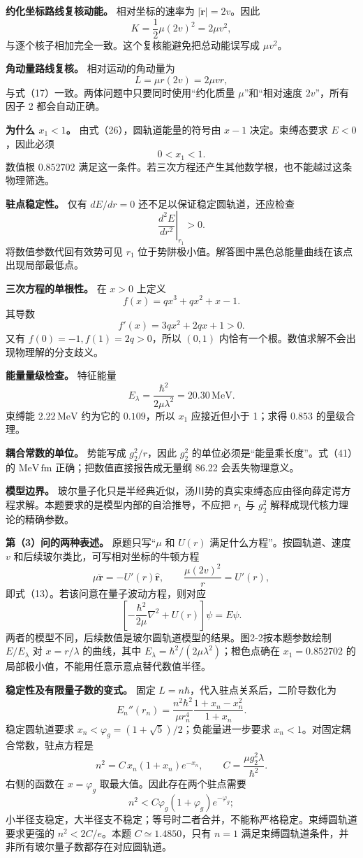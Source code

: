 \documentclass[12pt,a4paper,UTF8]{ctexart}
\begin{document}
\textbf{约化坐标路线复核动能。} 相对坐标的速率为
\(|\dot{\bm r}|=2v\)。因此 \[
K=\frac12\mu(2v)^2=2\mu v^2, \tag{43}
\] 与逐个核子相加完全一致。这个复核能避免把总动能误写成 \(\mu v^2\)。

\textbf{角动量路线复核。} 相对运动的角动量为 \[
L=\mu r(2v)=2\mu vr, \tag{44}
\] 与式（17）一致。两体问题中只要同时使用``约化质量
\(\mu\)''和``相对速度 \(2v\)''，所有因子 2 都会自动正确。

\textbf{为什么 \(x_1<1\)。} 由式（26），圆轨道能量的符号由 \(x-1\)
决定。束缚态要求 \(E<0\)，因此必须 \[
0<x_1<1. \tag{45}
\] 数值根 \(0.852702\)
满足这一条件。若三次方程还产生其他数学根，也不能越过这条物理筛选。

\textbf{驻点稳定性。} 仅有 \(dE/dr=0\) 还不足以保证稳定圆轨道，还应检查
\[
\left.\frac{d^2E}{dr^2}\right|_{r_1}>0. \tag{46}
\] 将数值参数代回有效势可见 \(r_1\)
位于势阱极小值。解答图中黑色总能量曲线在该点出现局部最低点。

\textbf{三次方程的单根性。} 在 \(x>0\) 上定义 \[
f(x)=qx^3+qx^2+x-1. \tag{47}
\] 其导数 \[
f'(x)=3qx^2+2qx+1>0. \tag{48}
\] 又有 \(f(0)=-1,f(1)=2q>0\)，所以 \((0,1)\)
内恰有一个根。数值求解不会出现物理解的分支歧义。

\textbf{能量量级检查。} 特征能量 \[
E_\lambda=\frac{\hbar^2}{2\mu\lambda^2}
=20.30\,\mathrm{MeV}. \tag{49}
\] 束缚能 \(2.22\,\mathrm{MeV}\) 约为它的 \(0.109\)，所以 \(x_1\)
应接近但小于 1；求得 \(0.853\) 的量级合理。

\textbf{耦合常数的单位。} 势能写成 \(g_2^2/r\)，因此 \(g_2^2\)
的单位必须是``能量乘长度''。式（41）的 \(\mathrm{MeV\,fm}\)
正确；把数值直接报告成无量纲 86.22 会丢失物理意义。

\textbf{模型边界。}
玻尔量子化只是半经典近似，汤川势的真实束缚态应由径向薛定谔方程求解。本题要求的是模型内部的自洽推导，不应把
\(r_1\) 与 \(g_2^2\) 解释成现代核力理论的精确参数。

\textbf{第（3）问的两种表述。} 原题只写``\(\mu\) 和 \(U(r)\)
满足什么方程''。按圆轨道、速度 \(v\)
和后续玻尔类比，可写相对坐标的牛顿方程 \[
\mu\ddot{\bm r}=-U'(r)\hat{\bm r},
\qquad \frac{\mu(2v)^2}{r}=U'(r),
\] 即式（13）。若该问意在量子波动方程，则对应 \[
\left[-\frac{\hbar^2}{2\mu}\nabla^2+U(r)\right]\psi=E\psi.
\] 两者的模型不同，后续数值是玻尔圆轨道模型的结果。图2-2按本题参数绘制
\(E/E_\lambda\) 对 \(x=r/\lambda\) 的曲线，其中
\(E_\lambda=\hbar^2/(2\mu\lambda^2)\)；橙色点确在 \(x_1=0.852702\)
的局部极小值，不能用任意示意点替代数值半径。

\textbf{稳定性及有限量子数的变式。} 固定
\(L=n\hbar\)，代入驻点关系后，二阶导数化为 \[
E_n''(r_n)=\frac{n^2\hbar^2}{\mu r_n^4}
\frac{1+x_n-x_n^2}{1+x_n}.
\] 稳定圆轨道要求 \(x_n<\varphi_g=(1+\sqrt5)/2\)；负能量进一步要求
\(x_n<1\)。对固定耦合常数，驻点方程是 \[
n^2=C\,x_n(1+x_n)e^{-x_n},
\qquad C=\frac{\mu g_2^2\lambda}{\hbar^2}.
\] 右侧的函数在 \(x=\varphi_g\) 取最大值。因此存在两个驻点需要 \[
n^2<C\varphi_g(1+\varphi_g)e^{-\varphi_g};
\]
小半径支稳定，大半径支不稳定；等号时二者合并，不能称严格稳定。束缚圆轨道要求更强的
\(n^2<2C/e\)。本题 \(C\simeq1.4850\)，只有 \(n=1\)
满足束缚圆轨道条件，并非所有玻尔量子数都存在对应圆轨道。
\end{document}
